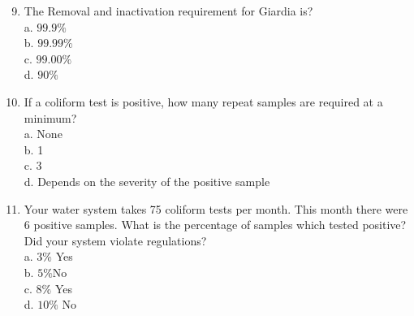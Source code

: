 \documentclass[10pt]{article}
\begin{document}
\begin{enumerate}
  \setcounter{enumi}{8}
  \item The Removal and inactivation requirement for Giardia is?\\
a. $99.9 \%$\\
b. $99.99 \%$\\
c. $99.00 \%$\\
d. $90 \%$

  \item If a coliform test is positive, how many repeat samples are required at a minimum?\\
a. None\\
b. 1\\
c. 3\\
d. Depends on the severity of the positive sample

  \item Your water system takes 75 coliform tests per month. This month there were 6 positive samples. What is the percentage of samples which tested positive? Did your system violate regulations?\\
a. $3 \%$ Yes\\
b. $5 \% \mathrm{No}$\\
c. $8 \%$ Yes\\
d. $10 \%$ No

\end{enumerate}
\end{document}

